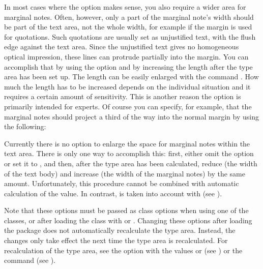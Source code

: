 \begin{Explain}
  In most cases where the option  makes sense, you also
  require a wider area for marginal notes. Often, however, only a part of the
  marginal note's width should be part of the text area, not the whole width,
  for example if the margin is used for quotations. Such quotations are
  usually set as unjustified text, with the flush edge against the text area. 
  Since the unjustified text gives no homogeneous optical impression, these
  lines can protrude partially into the margin. You can accomplish that by
  using the option  and by increasing the length
   after the type area has been set up. The length can
  be easily enlarged with the command . How much the length
  has to be increased depends on the individual situation and it requires a
  certain amount of sensitivity. This is another reason the 
  option is primarily intended for experts. Of course you can specify, for
  example, that the marginal notes should project a third of the way into the
  normal margin by using the following:
\begin{lstcode}
	\setlength{\marginparwidth}{1.5\marginparwidth}
\end{lstcode}

Currently there is no option to enlarge the space for marginal notes within
the text area. There is only one way to accomplish this: first, either omit
the  option or set it to , and then, after the
type area has been calculated, reduce  (the width of the
text body) and increase  (the width of the marginal
notes) by the same amount. Unfortunately, this procedure cannot be combined
with automatic calculation of the  value. In contrast,
 is taken into account with
 (see
).
\end{Explain}

Note that these options must be passed as class options
when using one of the {\KOMAScript} classes, or after loading the class with
 or .
Changing these options after loading the  package does not
automatically recalculate the type area. Instead, the changes only take effect
the next time the type area is recalculated. For recalculation of the type
area, see the \hyperref[desc:\LabelBase.option.DIV.last]{} option
with the values \hyperref[desc:\LabelBase.option.DIV.last]{} or
\hyperref[desc:\LabelBase.option.DIV.current]{} (see
) or the
 command (see
).%
%
\EndIndexGroup


